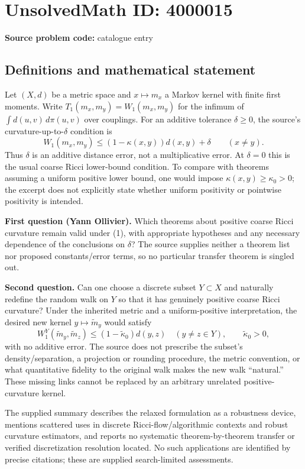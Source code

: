 \documentclass[11pt]{article}
\begin{document}
\section*{UnsolvedMath ID: 4000015}
\textbf{Source problem code:} catalogue entry
\subsection{Definitions and mathematical statement}
Let $(X,d)$ be a metric space and $x\mapsto m_x$ a Markov kernel with finite first moments. Write $T_1(m_x,m_y)=W_1(m_x,m_y)$ for the infimum of $\int d(u,v)\,d\pi(u,v)$ over couplings. For an additive tolerance $\delta\geq0$, the source's curvature-up-to-$\delta$ condition is
\[
 W_1(m_x,m_y)\leq(1-\kappa(x,y))d(x,y)+\delta
 \qquad(x\ne y). \tag{1}
\]
Thus $\delta$ is an additive distance error, not a multiplicative error. At $\delta=0$ this is the usual coarse Ricci lower-bound condition. To compare with theorems assuming a uniform positive lower bound, one would impose $\kappa(x,y)\geq\kappa_0>0$; the excerpt does not explicitly state whether uniform positivity or pointwise positivity is intended.

\textbf{First question (Yann Ollivier).} Which theorems about positive coarse Ricci curvature remain valid under (1), with appropriate hypotheses and any necessary dependence of the conclusions on $\delta$? The source supplies neither a theorem list nor proposed constants/error terms, so no particular transfer theorem is singled out.

\textbf{Second question.} Can one choose a discrete subset $Y\subset X$ and naturally redefine the random walk on $Y$ so that it has genuinely positive coarse Ricci curvature? Under the inherited metric and a uniform-positive interpretation, the desired new kernel $y\mapsto\widetilde m_y$ would satisfy
\[
 W_1^{Y}(\widetilde m_y,\widetilde m_z)
 \leq(1-\widetilde\kappa_0)d(y,z)
 \quad(y\ne z\in Y),\qquad\widetilde\kappa_0>0,
\]
with no additive error. The source does not prescribe the subset's density/separation, a projection or rounding procedure, the metric convention, or what quantitative fidelity to the original walk makes the new walk ``natural.'' These missing links cannot be replaced by an arbitrary unrelated positive-curvature kernel.

The supplied summary describes the relaxed formulation as a robustness device, mentions scattered uses in discrete Ricci-flow/algorithmic contexts and robust curvature estimators, and reports no systematic theorem-by-theorem transfer or verified discretization resolution located. No such applications are identified by precise citations; these are supplied search-limited assessments.
\end{document}
